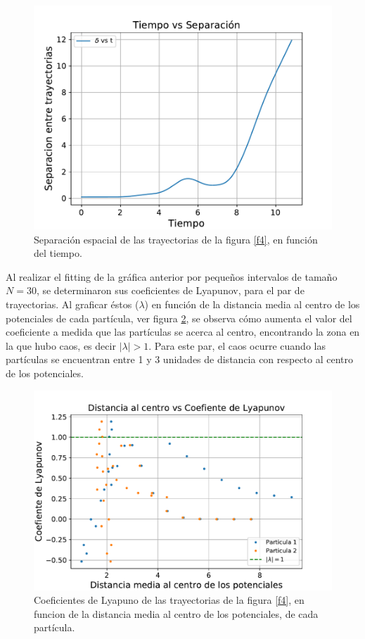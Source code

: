 \documentclass[11pt,letterpaper,twocolumn]{article}
\begin{document}
\begin{figure}[H]
\centering 
\includegraphics[scale=0.55]{g6.pdf}
\caption{Separación espacial de las trayectorias de la figura \ref{f4}, en función del tiempo.}
\label{f5}
\end{figure}  
\par 
Al realizar el fitting de la gráfica anterior por pequeños intervalos de tamaño $N=30$, se determinaron sus coeficientes de Lyapunov, para el par de trayectorias. Al graficar éstos ($\lambda$) en función de la distancia media al centro de los potenciales de cada partícula, ver figura \ref{f6}, se observa cómo aumenta el valor del coeficiente a medida que las partículas se acerca al centro, encontrando la zona en la que hubo caos, es decir $ \vert \lambda \vert > 1$. Para este par, el caos ocurre cuando las partículas se encuentran entre 1 y 3 unidades de distancia con respecto al centro de los potenciales.\\
\begin{figure}[H]
\centering 
\includegraphics[scale=0.5]{g7.pdf}
\caption{Coeficientes de Lyapuno de las trayectorias de la figura \ref{f4}, en funcion de la distancia media al centro de los potenciales, de cada partícula.}
\label{f6}
\end{figure}
\end{document}
